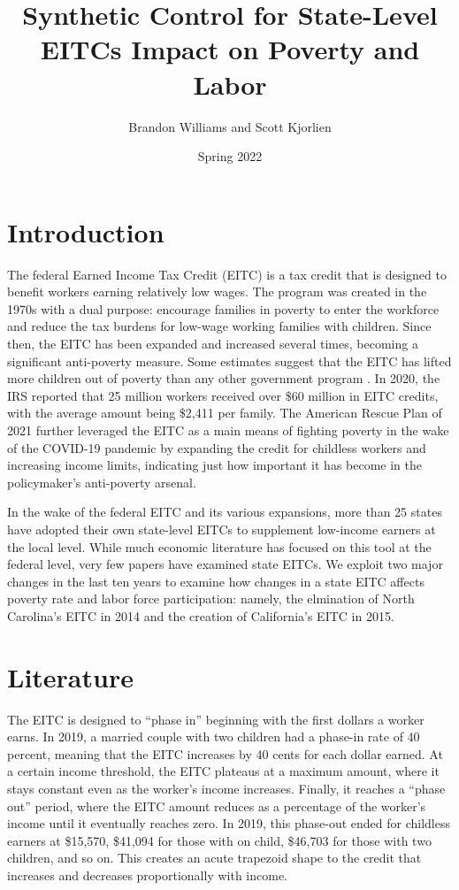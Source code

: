 \documentclass{article}
\author{Brandon Williams and Scott Kjorlien}
\title{Synthetic Control for State-Level EITCs Impact on Poverty and Labor}
\date{Spring 2022}
\begin{document}
\maketitle

\section{Introduction}

The federal Earned Income Tax Credit (EITC) is a tax credit that is designed to benefit workers earning relatively low wages. The program was created in the 1970s with a dual purpose: encourage families in poverty to enter the workforce and reduce the tax burdens for low-wage working families with children. Since then, the EITC has been expanded and increased several times, becoming a significant anti-poverty measure. Some estimates suggest that the EITC has lifted more children out of poverty than any other government program  \citep{zahradnik2004state}. In 2020, the IRS reported that 25 million workers received over \$60 million in EITC credits, with the average amount being \$2,411 per family. The American Rescue Plan of 2021 further leveraged the EITC as a main means of fighting poverty in the wake of the COVID-19 pandemic by expanding the credit for childless workers and increasing income limits, indicating just how important it has become in the policymaker’s anti-poverty arsenal.

In the wake of the federal EITC and its various expansions, more than 25 states have adopted their own state-level EITCs to supplement low-income earners at the local level. While much economic literature has focused on this tool at the federal level, very few papers have examined state EITCs. We exploit two major changes in the last ten years to examine how changes in a state EITC affects poverty rate and labor force participation: namely, the elmination of North Carolina's EITC in 2014 and the creation of California's EITC in 2015. 

\section{Literature}

The EITC is designed to “phase in” beginning with the first dollars a worker earns. In 2019, a married couple with two children had a phase-in rate of 40 percent, meaning that the EITC increases by 40 cents for each dollar earned. At a certain income threshold, the EITC plateaus at a maximum amount, where it stays constant even as the worker’s income increases. Finally, it reaches a “phase out” period, where the EITC amount reduces as a percentage of the worker’s income until it eventually reaches zero. In 2019, this phase-out ended for childless earners at \$15,570, \$41,094 for those with on child, \$46,703 for those with two children, and so on. This creates an acute trapezoid shape to the credit that increases and decreases proportionally with income. 
\end{document}
